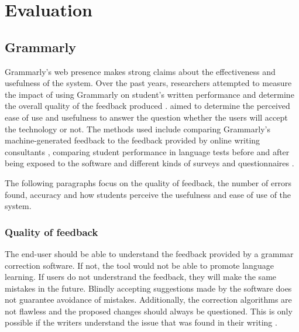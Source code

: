\documentclass[runningheads]{llncs}
\let\OldTextregistered\textregistered
\renewcommand{\textregistered}{\OldTextregistered\xspace}
\begin{document}
\section{Evaluation}

\subsection{Grammarly\textregistered}
Grammarly\textregistered's web presence \citep{noauthor_grammarly_nodate} makes strong claims about the effectiveness and usefulness of the system. Over the past years, researchers attempted to measure the impact of using Grammarly\textregistered on student's written performance and determine the overall quality of the feedback produced \citep{dembsey_closing_2017,nova_utilizing_2018,ventayen_graduate_2018}. \textcite{cavaleri_you_2016} aimed to determine the perceived ease of use and usefulness to answer the question whether the users will accept the technology or not. The methods used include comparing Grammarly\textregistered's machine-generated feedback to the feedback provided by online writing consultants \citep{dembsey_closing_2017}, comparing student performance in language tests before and after being exposed to the software \citep{qassemzadeh_impact_2016} and different kinds of surveys and questionnaires \citep{nova_utilizing_2018, cavaleri_you_2016, ventayen_graduate_2018}.

The following paragraphs focus on the quality of feedback, the number of errors found, accuracy and how students perceive the usefulness and ease of use of the system.

\subsubsection{Quality of feedback}
The end-user should be able to understand the feedback provided by a grammar correction software. If not, the tool would not be able to promote language learning. If users do not understrand the feedback, they will make the same mistakes in the future. Blindly accepting suggestions made by the software does not guarantee avoidance of mistakes. Additionally, the correction algorithms are not flawless and the proposed changes should always be questioned. This is only possible if the writers understand the issue that was found in their writing \citep{dembsey_closing_2017}.
\end{document}
